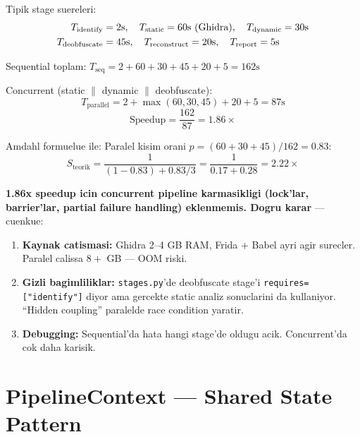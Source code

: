 \documentclass[12pt,a4paper,oneside]{book}
\theoremstyle{definition}
\newcommand{\code}[1]{\texttt{\color{green!60!white}#1}}
\begin{document}
\begin{tanim}
Tipik stage suereleri:
\begin{align}
T_{\text{identify}} &= 2\text{s}, \quad T_{\text{static}} = 60\text{s (Ghidra)}, \quad T_{\text{dynamic}} = 30\text{s} \notag \\
T_{\text{deobfuscate}} &= 45\text{s}, \quad T_{\text{reconstruct}} = 20\text{s}, \quad T_{\text{report}} = 5\text{s} \notag
\end{align}

Sequential toplam: $T_{\text{seq}} = 2 + 60 + 30 + 45 + 20 + 5 = 162\text{s}$

Concurrent (static $\|$ dynamic $\|$ deobfuscate):
\begin{equation}
T_{\text{parallel}} = 2 + \max(60, 30, 45) + 20 + 5 = 87\text{s}
\end{equation}
\begin{equation}
\text{Speedup} = \frac{162}{87} = 1.86\times
\end{equation}

Amdahl formuelue ile: Paralel kisim orani $p = (60+30+45)/162 = 0.83$:
\begin{equation}
S_{\text{teorik}} = \frac{1}{(1-0.83) + 0.83/3} = \frac{1}{0.17 + 0.28} = 2.22\times
\end{equation}
\end{tanim}

\textbf{1.86x speedup icin concurrent pipeline karmasikligi (lock'lar, barrier'lar, partial failure handling) eklenmemis. Dogru karar} --- cuenkue:

\begin{enumerate}
\item \textbf{Kaynak catismasi:} Ghidra 2--4 GB RAM, Frida + Babel ayri ag\-ir surecler. Paralel calissa $8+$ GB --- OOM riski.
\item \textbf{Gizli bagimliliklar:} \code{stages.py}'de deobfuscate stage'i \code{requires=["identify"]} diyor ama gercekte static analiz sonuclarini da kullaniyor. ``Hidden coupling'' paralelde race condition yaratir.
\item \textbf{Debugging:} Sequential'da hata hangi stage'de oldugu acik. Concurrent'da cok daha karisik.
\end{enumerate}

\section{PipelineContext --- Shared State Pattern}
\label{sec:context}
\end{document}
